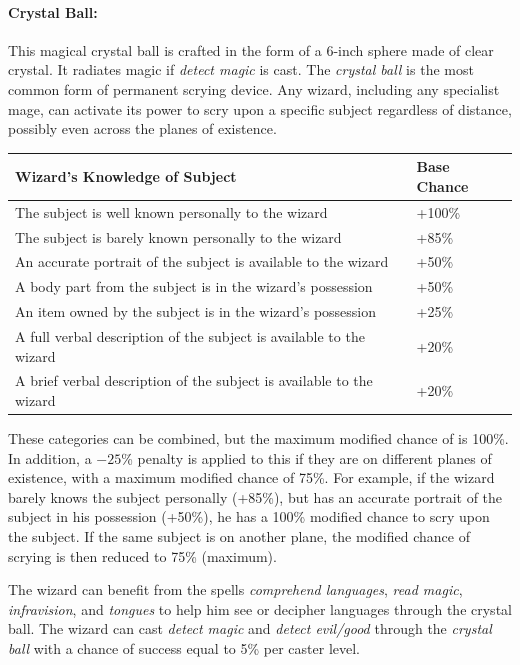 \begin{multicols}{2}
\paragraph{Crystal Ball:} This magical crystal ball is crafted in the form of a 6-inch sphere made of clear crystal.  It radiates magic if \textit{detect magic} is cast.  The \textit{crystal ball} is the most common form of permanent scrying device.  Any wizard, including any specialist mage, can activate its power to scry upon a specific subject regardless of distance, possibly even across the planes of existence.

\noindent \begin{tabular}{|p{}|p{}|}
\hline
Wizard's Knowledge of Subject	& Base Chance \\
\hline\hline
\rowcolor[gray]{.9}The subject is well known personally to the wizard	& +100\% \\
The subject is barely known personally to the wizard	& +85\% \\
\rowcolor[gray]{.9}An accurate portrait of the subject is available to the wizard	& +50\% \\
A body part from the subject is in the wizard's possession	& +50\% \\
\rowcolor[gray]{.9}An item owned by the subject is in the wizard's possession	& +25\% \\
A full verbal description of the subject is available to the wizard	& +20\% \\
\rowcolor[gray]{.9}A brief verbal description of the subject is available to the wizard	& +20\% \\
\hline
\end{tabular}

These categories can be combined, but the maximum modified chance of is 100\%.  In addition, a $-25$\% penalty is applied to this if they are on different planes of existence, with a maximum modified chance of 75\%.  For example, if the wizard barely knows the subject personally (+85\%), but has an accurate portrait of the subject in his possession (+50\%), he has a 100\% modified chance to scry upon the subject.  If the same subject is on another plane, the modified chance of scrying is then reduced to 75\% (maximum).

The wizard can benefit from the spells \textit{comprehend languages}, \textit{read magic}, \textit{infravision}, and \textit{tongues} to help him see or decipher languages through the crystal ball.  The wizard can cast \textit{detect magic} and \textit{detect evil/good} through the \textit{crystal ball} with a chance of success equal to 5\% per caster level.


\end{multicols}
